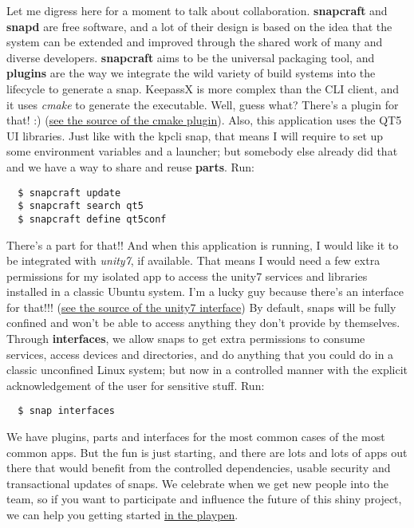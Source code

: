 \documentclass[12pt]{article}
\begin{document}
Let me digress here for a moment to talk about collaboration.
\textbf{snapcraft} and \textbf{snapd} are free software, and a lot of their
design is based on the idea that the system can be extended and improved through
the shared work of many and diverse developers. \textbf{snapcraft} aims to be
the universal packaging tool, and \textbf{plugins} are the way we integrate the
wild variety of build systems into the lifecycle to generate a snap. KeepassX is
more complex than the CLI client, and it uses \emph{cmake} to generate the
executable. Well, guess what? There's a plugin for that! :)
(\href{https://github.com/snapcore/snapcraft/blob/master/snapcraft/plugins/cmake.py}
{see the source of the cmake plugin}). Also, this application uses the QT5 UI
libraries. Just like with the kpcli snap, that means I will require to set up
some environment variables and a launcher; but somebody else already did that and we
have a way to share and reuse \textbf{parts}. Run:

\begin{verbatim}
  $ snapcraft update
  $ snapcraft search qt5
  $ snapcraft define qt5conf
\end{verbatim}

There's a part for that!! And when this application is running, I would like it
to be integrated with \emph{unity7}, if available. That means I would need a few
extra permissions for my isolated app to access the unity7 services and
libraries installed in a classic Ubuntu system. I'm a lucky guy because there's
an interface for that!!!
(\href{https://github.com/snapcore/snapd/blob/master/interfaces/builtin/unity7.go}
{see the source of the unity7 interface}) By default, snaps will be fully
confined and won't be able to access anything they don't provide by themselves.
Through \textbf{interfaces}, we allow snaps to get extra permissions to consume
services, access devices and directories, and do anything that you could do in a
classic unconfined Linux system; but now in a controlled manner with the
explicit acknowledgement of the user for sensitive stuff. Run:

\begin{verbatim}
  $ snap interfaces
\end{verbatim}

We have plugins, parts and interfaces for the most common cases of the most
common apps. But the fun is just starting, and there are lots and lots of apps
out there that would benefit from the controlled dependencies, usable security
and transactional updates of snaps. We celebrate when we get new people into the
team, so if you want to participate and influence the future of this shiny
project, we can help you getting started
\href{https://developer.ubuntu.com/en/blog/2016/06/08/snappy-playpen-kickoff-highlights/}
{in the playpen}.
\end{document}
